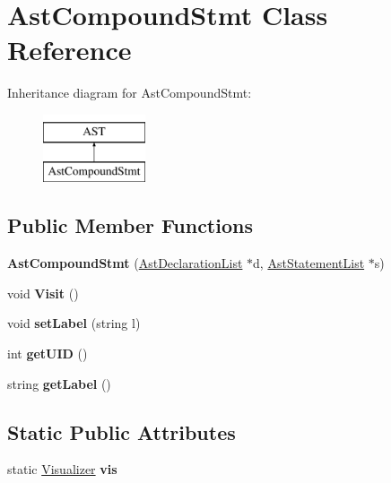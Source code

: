 \hypertarget{classAstCompoundStmt}{\section{Ast\-Compound\-Stmt Class Reference}
\label{classAstCompoundStmt}
}
Inheritance diagram for Ast\-Compound\-Stmt\-:\begin{figure}[H]
\begin{center}
\leavevmode
\includegraphics[height=2.000000cm]{classAstCompoundStmt}
\end{center}
\end{figure}
\subsection*{Public Member Functions}
\begin{DoxyCompactItemize}
\item 
\hypertarget{classAstCompoundStmt_af9005e930ed909289b88f84f9c7dffc1}{{\bfseries Ast\-Compound\-Stmt} (\hyperlink{classAstDeclarationList}{Ast\-Declaration\-List} $\ast$d, \hyperlink{classAstStatementList}{Ast\-Statement\-List} $\ast$s)}\label{classAstCompoundStmt_af9005e930ed909289b88f84f9c7dffc1}

\item 
\hypertarget{classAstCompoundStmt_a6ff97b453379db290afe4c4c17ad5244}{void {\bfseries Visit} ()}\label{classAstCompoundStmt_a6ff97b453379db290afe4c4c17ad5244}

\item 
\hypertarget{classAST_a71d680856e95ff89f55d5311a552eba6}{void {\bfseries set\-Label} (string l)}\label{classAST_a71d680856e95ff89f55d5311a552eba6}

\item 
\hypertarget{classAST_ab7a5b1d9f1c2de0d98deb356f724a42c}{int {\bfseries get\-U\-I\-D} ()}\label{classAST_ab7a5b1d9f1c2de0d98deb356f724a42c}

\item 
\hypertarget{classAST_aee029be902fffc927d16ccb03eb922ad}{string {\bfseries get\-Label} ()}\label{classAST_aee029be902fffc927d16ccb03eb922ad}

\end{DoxyCompactItemize}
\subsection*{Static Public Attributes}
\begin{DoxyCompactItemize}
\item 
\hypertarget{classAST_aca9e6637209b31e03a09c0d42f29bdfa}{static \hyperlink{classVisualizer}{Visualizer} {\bfseries vis}}\label{classAST_aca9e6637209b31e03a09c0d42f29bdfa}

\end{DoxyCompactItemize}
